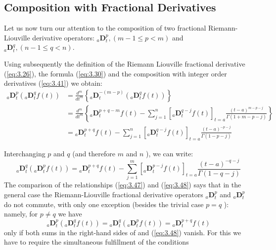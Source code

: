 \documentclass[a4paper,14pt,oneside]{book}
\theoremstyle{plain}
\theoremstyle{definition}
\theoremstyle{remark}
\begin{document}
\begin{center}
\begin{flushleft}
{\section{Composition with Fractional Derivatives}
Let us now turn our attention to the composition of two fractional Riemann-Liouville derivative operators: ${ }_{a} \mathbf{D}_{t}^{p}, (m-1 \leq p<m)$ and ${ }_{a} \mathbf{D}_{t}^{q}, (n-1 \leq q<n) .$
\par Using subsequently the definition of the Riemann Liouville fractional derivative (\ref{eq:3.26}), the formula (\ref{eq:3.30}) and the composition with integer order derivatives (\ref{eq:3.41}) we obtain:
\begin{align}\label{eq:3.47}
{ }_{a} \mathbf{D}_{t}^{p}\left({ }_{a} \mathbf{D}_{t}^{q} f(t)\right)&= \frac{d^{m}}{d t^{m}}\left\{{ }_{a} \mathbf{D}_{t}^{-(m-p)}\left({ }_{a} \mathbf{D}_{t}^{q} f(t)\right)\right\}\nonumber \\
&=\frac{d^{m}}{d t^{m}}\left\{{ }_{a} \mathbf{D}_{t}^{p+q-m} f(t) -\sum_{j=1}^{n}\left[{ }_{a} \mathbf{D}_{t}^{q-j} f(t)\right]_{t=a} \frac{(t-a)^{m-p-j}}{\Gamma(1+m-p-j)}\right\} \nonumber\\
&={ }_{a} \mathbf{D}_{t}^{p+q} f(t)-\sum_{j=1}^{n}\left[{ }_{a} \mathbf{D}_{t}^{q-j} f(t)\right]_{t=a} \frac{(t-a)^{-p-j}}{\Gamma(1-p-j)}
\end{align}
\par Interchanging $p$ and $q$ (and therefore $m$ and $n$ ), we can write:
\begin{equation}\label{eq:3.48}
{ }_{a} \mathbf{D}_{t}^{q}\left({ }_{a} \mathbf{D}_{t}^{p} f(t)\right)={ }_{a} \mathbf{D}_{t}^{p+q} f(t)-\sum_{j=1}^{m}\left[{ }_{a} \mathbf{D}_{t}^{p-j} f(t)\right]_{t=a} \frac{(t-a)^{-q-j}}{\Gamma(1-q-j)}
\end{equation}
The comparison of the relationships (\ref{eq:3.47}) and (\ref{eq:3.48}) says that in the general case the Riemann-Liouville fractional derivative operators ${ }_{a} \mathbf{D}_{t}^{p}$ and ${ }_{a} \mathbf{D}_{t}^{p}$ do not commute, with only one exception (besides the trivial case $p=q$ ): namely, for $p \neq q$ we have
\begin{equation}\label{eq:3.49}
{ }_{a} \mathbf{D}_{t}^{p}\left({ }_{a} \mathbf{D}_{t}^{q} f(t)\right)={ }_{a} \mathbf{D}_{t}^{q}\left({ }_{a} \mathbf{D}_{t}^{p} f(t)\right)={ }_{a} \mathbf{D}_{t}^{p+q} f(t)
\end{equation}
only if both sums in the right-hand sides of  and (\ref{eq:3.48}) vanish. For this we have to require the simultaneous fulfillment of the conditions
}
\end{flushleft}
\end{center}
\end{document}
